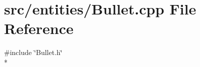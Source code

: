\section{src/entities/\-Bullet.cpp File Reference}
\label{_bullet_8cpp}
{\ttfamily \#include \char`\"{}Bullet.\-h\char`\"{}}\\*
